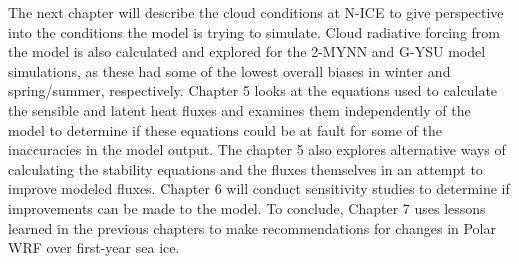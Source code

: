 The next chapter will describe the cloud conditions at N-ICE to give perspective into the conditions the model is trying to simulate. Cloud radiative forcing from the model is also calculated and explored for the 2-MYNN and G-YSU model simulations, as these had some of the lowest overall biases in winter and spring/summer, respectively. Chapter 5 looks at the equations used to calculate the sensible and latent heat fluxes and examines them independently of the model to determine if these equations could be at fault for some of the inaccuracies in the model output. The chapter 5 also explores alternative ways of calculating the stability equations and the fluxes themselves in an attempt to improve modeled fluxes. Chapter 6 will conduct sensitivity studies to determine if improvements can be made to the model. To conclude, Chapter 7 uses lessons learned in the previous chapters to make recommendations for changes in Polar WRF over first-year sea ice. 